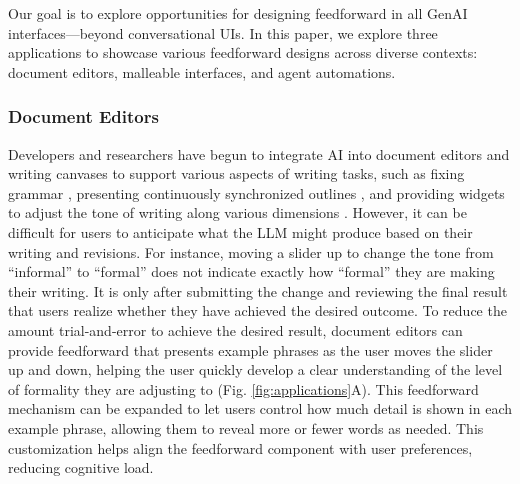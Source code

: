 Our goal is to explore opportunities for designing feedforward in all GenAI interfaces---beyond conversational UIs.
In this paper, we explore three applications to showcase various feedforward designs across diverse contexts: document editors, malleable interfaces, and agent automations.


\subsubsection{Document Editors}

Developers and researchers have begun to integrate AI into document editors and writing canvases to support various aspects of writing tasks, such as fixing grammar \cite{laban2024inksync}, presenting continuously synchronized outlines \cite{dang2022beyondtextgen}, and providing widgets to adjust the tone of writing along various dimensions \cite{masson2024textoshop, chatgptcanvas2025}.
However, it can be difficult for users to anticipate what the LLM might produce based on their writing and revisions. For instance, moving a slider up to change the tone from ``informal'' to ``formal'' does not indicate exactly how ``formal'' they are making their writing. It is only after submitting the change and reviewing the final result that users realize whether they have achieved the desired outcome. To reduce the amount trial-and-error to achieve the desired result, document editors can provide feedforward that presents example phrases as the user moves the slider up and down, helping the user quickly develop a clear understanding of the level of formality they are adjusting to (Fig. \ref{fig:applications}A). This feedforward mechanism can be expanded to let users control how much detail is shown in each example phrase, allowing them to reveal more or fewer words as needed. This customization helps align the feedforward component with user preferences, reducing cognitive load.



